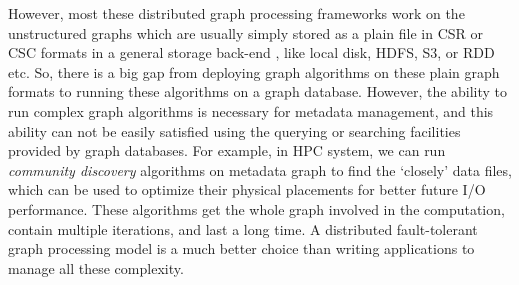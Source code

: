 However, most these distributed graph processing frameworks work on the unstructured graphs which are usually simply stored as a plain file in CSR or CSC formats in a general storage back-end , like local disk, HDFS, S3, or RDD etc. So, there is a big gap from deploying graph algorithms on these plain graph formats to running these algorithms on a graph database. However, the ability to run complex graph algorithms is necessary for metadata management, and this ability can not be easily satisfied using the querying or searching facilities provided by graph databases. For example, in HPC system, we can run \textit{community discovery} algorithms on metadata graph to find the `closely' data files, which can be used to optimize their physical placements for better future I/O performance. These algorithms get the whole graph involved in the computation, contain multiple iterations, and last a long time. A distributed fault-tolerant graph processing model is a much better choice than writing applications to manage all these complexity.